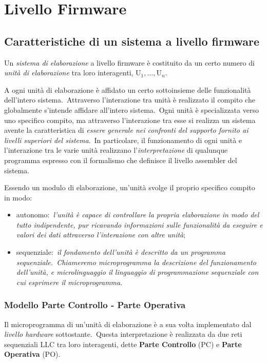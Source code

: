 \chapter{Livello Firmware}

\section{Caratteristiche di un sistema a livello firm\-ware}

Un \textit{sistema di elaborazione} a livello firmware è costituito da un certo numero di \textit{unità di elaborazione} tra loro interagenti, $\mathrm{U}_1, \dots, \mathrm{U}_n$.

A ogni unità di elaborazione è affidato un certo sottoinsieme delle funzionalità dell'intero sistema.\
Attraverso l'interazione tra unità è realizzato il compito che globalmente s'intende affidare all'intero sistema.\
Ogni unità è specializzata verso uno specifico compito, ma attraverso l'interazione tra esse si realizza un sistema avente la caratteristica di \textit{essere generale nei confronti del supporto fornito ai livelli superiori del sistema}.\
In particolare, il funzionamento di ogni unità e l'interazione tra le varie unità realizzano l'\textit{interpretazione} di qualunque programma espresso con il formalismo che definisce il livello assembler del sistema.

Essendo un modulo di elaborazione, un'unità svolge il proprio specifico compito in modo:

\begin{itemize}
    \item autonomo:\ \textit{l'unità è capace di controllare la propria elaborazione in modo del tutto indipendente, pur ricavando informazioni sulle funzionalità da eseguire e valori dei dati attraverso l'interazione con altre unità};
    \item sequenziale:\ \textit{il fondamento dell'unità è descritto da un programma sequenziale.\ Chiameremo microprogramma la descrizione del funzionamento dell'unità, e microlinguaggio il linguaggio di programmazione sequenziale con cui esprimere il microprogramma}.
\end{itemize}

\subsection{Modello Parte Controllo - Parte Operativa}

Il microprogramma di un'unità di elaborazione è a sua volta implementato dal \textit{livello hardware} sottostante.\
Questa interpretazione è realizzata da due reti sequenziali LLC tra loro interagenti, dette \textbf{Parte Controllo} (PC) e \textbf{Parte Operativa} (PO).

